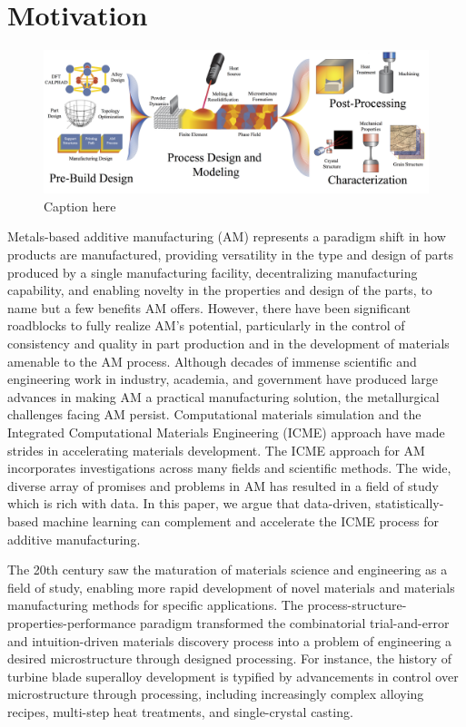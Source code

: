 \section{Motivation}
\begin{figure}[t]
	\includegraphics[width=1\linewidth]{Images/AMgene.png}
	\caption{Caption here}
	\label{AMgene}
\end{figure}

Metals-based additive manufacturing (AM) represents a paradigm shift in how products are manufactured, providing versatility in the type and design of parts produced by a single manufacturing facility, decentralizing manufacturing capability, and enabling novelty in the properties and design of the parts, to name but a few benefits AM offers. However, there have been significant roadblocks to fully realize AM's potential, particularly in the control of consistency and quality in part production and in the development of materials amenable to the AM process. Although decades of immense scientific and engineering work in industry, academia, and government have produced large advances in making AM a practical manufacturing solution, the metallurgical challenges facing AM persist. Computational materials simulation and the Integrated Computational Materials Engineering (ICME) approach have made strides in accelerating materials development. The ICME approach for AM incorporates investigations across many fields and scientific methods. The wide, diverse array of promises and problems in AM has resulted in a field of study which is rich with data. In this paper, we argue that data-driven, statistically-based machine learning can complement and accelerate the ICME process for additive manufacturing. 


The 20th century saw the maturation of materials science and engineering as a field of study, enabling more rapid development of novel materials and materials manufacturing methods for specific applications. The process-structure-properties-performance paradigm transformed the combinatorial trial-and-error and intuition-driven materials discovery process into a problem of engineering a desired microstructure through designed processing. For instance, the history of turbine blade superalloy development is typified by advancements in control over microstructure through processing, including increasingly complex alloying recipes, multi-step heat treatments, and single-crystal casting. 

